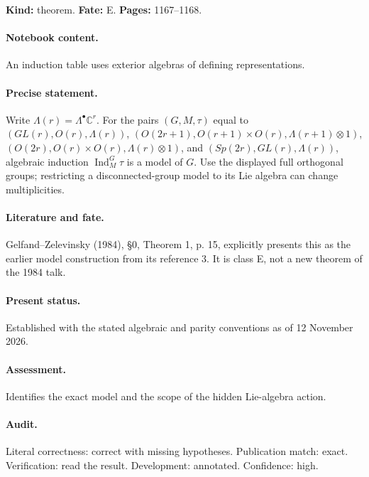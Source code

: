 \label{item:1983-621.4}

\noindent\textbf{Kind:} theorem. \textbf{Fate:} E. \textbf{Pages:} 1167--1168.\par

\paragraph{Notebook content.} An induction table uses exterior algebras of defining representations.

\paragraph{Precise statement.} Write \(\Lambda(r)=\Lambda^\bullet\mathbb C^r\). For the pairs \((G,M,\tau)\) equal to \((GL(r),O(r),\Lambda(r))\), \((O(2r+1),O(r+1)\times O(r),\Lambda(r+1)\otimes1)\), \((O(2r),O(r)\times O(r),\Lambda(r)\otimes1)\), and \((Sp(2r),GL(r),\Lambda(r))\), algebraic induction \(\operatorname{Ind}_M^G\tau\) is a model of \(G\). Use the displayed full orthogonal groups; restricting a disconnected-group model to its Lie algebra can change multiplicities.

\paragraph{Literature and fate.} Gelfand–Zelevinsky (1984), \S0, Theorem 1, p. 15, explicitly presents this as the earlier model construction from its reference 3. It is class E, not a new theorem of the 1984 talk.

\paragraph{Present status.} Established with the stated algebraic and parity conventions as of 12 November 2026.

\paragraph{Assessment.} Identifies the exact model and the scope of the hidden Lie-algebra action.

\paragraph{Audit.} Literal correctness: correct with missing hypotheses. Publication match: exact. Verification: read the result. Development: annotated. Confidence: high.

